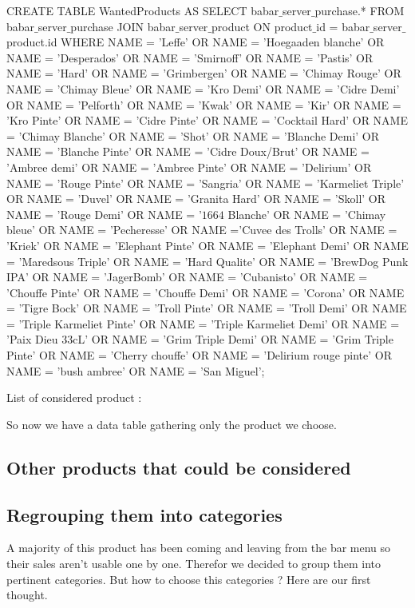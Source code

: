 \documentclass{report}
\begin{document}
CREATE TABLE WantedProducts AS
    SELECT babar$\_$server$\_$purchase.* FROM babar$\_$server$\_$purchase JOIN babar$\_$server$\_$product ON product$\_$id = babar$\_$server$\_$product.id WHERE NAME = 'Leffe' OR NAME = 'Hoegaaden blanche' OR NAME = 'Desperados' OR NAME = 'Smirnoff' OR NAME = 'Pastis' OR NAME = 'Hard' OR NAME = 'Grimbergen' OR NAME = 'Chimay Rouge' OR NAME = 'Chimay Bleue' OR NAME = 'Kro Demi' OR NAME = 'Cidre Demi' OR NAME = 'Pelforth' OR NAME = 'Kwak' OR NAME = 'Kir' OR NAME = 'Kro Pinte' OR NAME = 'Cidre Pinte' OR NAME = 'Cocktail Hard' OR NAME = 'Chimay Blanche' OR NAME = 'Shot'  OR NAME = 'Blanche Demi' OR NAME = 'Blanche Pinte' OR NAME = 'Cidre Doux/Brut' OR NAME = 'Ambree demi' OR NAME = 'Ambree Pinte'  OR NAME = 'Delirium' OR NAME = 'Rouge Pinte' OR NAME = 'Sangria' OR NAME = 'Karmeliet Triple' OR NAME = 'Duvel' OR NAME = 'Granita Hard' OR NAME = 'Skoll' OR NAME = 'Rouge Demi' OR NAME = '$1664$ Blanche' OR NAME = 'Chimay bleue' OR NAME = 'Pecheresse' OR NAME ='Cuvee des Trolls'  OR NAME = 'Kriek' OR NAME = 'Elephant Pinte' OR NAME = 'Elephant Demi' OR NAME = 'Maredsous Triple' OR NAME = 'Hard Qualite' OR NAME = 'BrewDog Punk IPA' OR NAME = 'JagerBomb' OR NAME = 'Cubanisto' OR NAME = 'Chouffe Pinte' OR NAME = 'Chouffe Demi' OR NAME = 'Corona' OR NAME = 'Tigre Bock' OR NAME = 'Troll Pinte' OR NAME = 'Troll Demi' OR NAME = 'Triple Karmeliet Pinte' OR NAME = 'Triple Karmeliet Demi' OR NAME = 'Paix Dieu $33$cL' OR NAME = 'Grim Triple Demi' OR NAME = 'Grim Triple Pinte' OR NAME = 'Cherry chouffe' OR NAME = 'Delirium rouge pinte' OR NAME = 'bush ambree' OR NAME = 'San Miguel';
		
List of considered product :

So now we have a data table gathering only the product we choose.

\subsection{Other products that could be considered}

\subsection{Regrouping them into categories}

A majority of this product has been coming and leaving from the bar menu so their sales aren't usable one by one. Therefor we decided to group them into pertinent categories. But how to choose this categories ? Here are our first thought.
\end{document}
